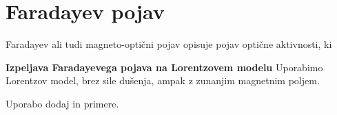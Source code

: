 \section{Faradayev pojav}
Faradayev ali tudi magneto-optični pojav opisuje pojav optične aktivnosti, ki 



\begin{example}{\bf Izpeljava Faradayevega pojava na Lorentzovem modelu}
Uporabimo Lorentzov model, brez sile dušenja, ampak z zunanjim magnetnim poljem.
\end{example}




Uporabo dodaj in primere.
